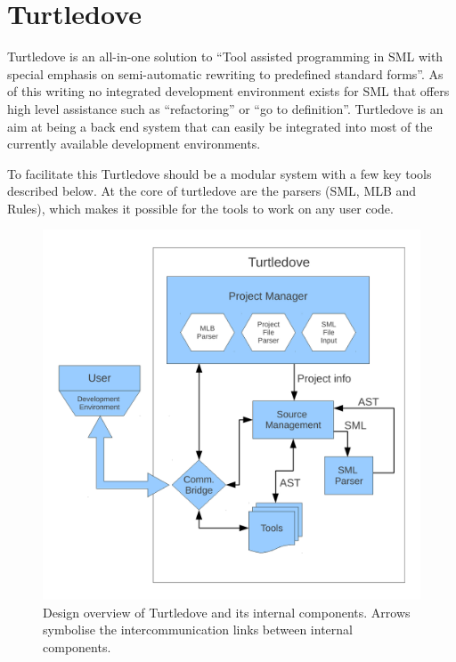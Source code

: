 \section{Turtledove}
\label{sec:design-turtledove}

Turtledove is an all-in-one solution to ``Tool assisted programming in SML with
special emphasis on semi-automatic rewriting to predefined standard forms''. As
of this writing no integrated development environment exists for SML that offers
high level assistance such as ``refactoring'' or ``go to definition''.
Turtledove is an aim at being a back end system that can easily be integrated
into most of the currently available development environments.

To facilitate this Turtledove should be a modular system with a few key tools
described below. At the core of turtledove are the parsers (SML, MLB and Rules),
which makes it possible for the tools to work on any user code.

\begin{figure}[h!]
  \centering
 \includegraphics[scale=0.4]{imgs/design/flow.pdf}
  \caption{Design overview of Turtledove and its internal components. Arrows
    symbolise the intercommunication links between internal components.}
  \label{fig:turtledove-design}
\end{figure}

